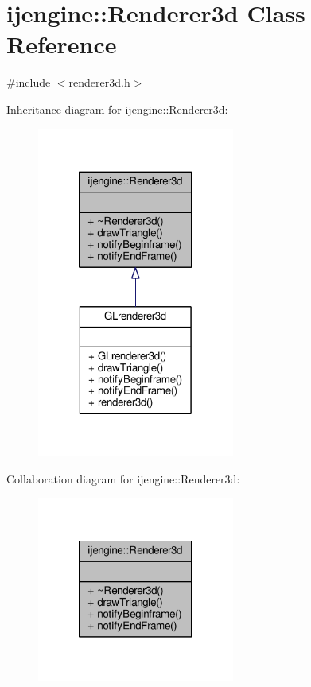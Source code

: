 \hypertarget{classijengine_1_1Renderer3d}{\section{ijengine\-:\-:Renderer3d Class Reference}
\label{classijengine_1_1Renderer3d}
}


{\ttfamily \#include $<$renderer3d.\-h$>$}



Inheritance diagram for ijengine\-:\-:Renderer3d\-:\nopagebreak
\begin{figure}[H]
\begin{center}
\leavevmode
\includegraphics[width=184pt]{classijengine_1_1Renderer3d__inherit__graph}
\end{center}
\end{figure}


Collaboration diagram for ijengine\-:\-:Renderer3d\-:\nopagebreak
\begin{figure}[H]
\begin{center}
\leavevmode
\includegraphics[width=184pt]{classijengine_1_1Renderer3d__coll__graph}
\end{center}
\end{figure}

